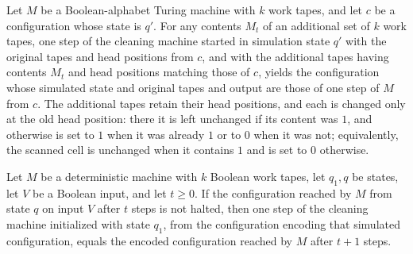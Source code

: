 \begin{lemma}
\label{Complexity.LogProg.step_sim}
\leanok
{}
Let $M$ be a Boolean-alphabet Turing machine with $k$ work tapes, and let $c$ be a
configuration whose state is $q'$. For any contents $M_t$ of an additional set of $k$
work tapes, one step of the cleaning machine started in simulation state $q'$ with the
original tapes and head positions from $c$, and with the additional tapes having
contents $M_t$ and head positions matching those of $c$, yields the configuration whose
simulated state and original tapes and output are those of one step of $M$ from $c$. The
additional tapes retain their head positions, and each is changed only at the old head
position: there it is left unchanged if its content was $1$, and otherwise is set to $1$
when it was already $1$ or to $0$ when it was not; equivalently, the scanned cell is
unchanged when it contains $1$ and is set to $0$ otherwise.
\end{lemma}

\begin{lemma}
\label{Complexity.LogProg.sim_step_clean}
\leanok
{}
Let $M$ be a deterministic machine with $k$ Boolean work tapes, let $q_1,q$ be states,
let $V$ be a Boolean input, and let $t\ge 0$. If the configuration reached by $M$ from
state $q$ on input $V$ after $t$ steps is not halted, then one step of the cleaning
machine initialized with state $q_1$, from the configuration encoding that simulated
configuration, equals the encoded configuration reached by $M$ after $t+1$ steps.
\end{lemma}

